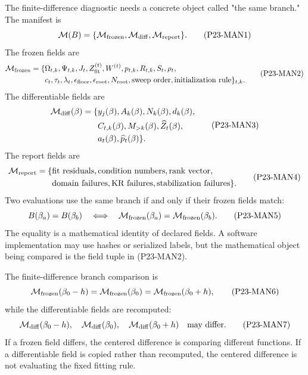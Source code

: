 \documentclass[11pt]{article}
\begin{document}
The finite-difference diagnostic needs a concrete object called "the same
branch."  The manifest is
\[
    \mathcal M(B)
    =
    \{\mathcal M_{\rm frozen},\mathcal M_{\rm diff},\mathcal M_{\rm report}\}.
    \tag{P23-MAN1}
\]
The frozen fields are
\[
\begin{aligned}
    \mathcal M_{\rm frozen}
    =
    \{&
    \Omega_{t,k},\Psi_{t,k},J_t,
    Z_{\rm fit}^{(t)},W^{(t)},p_{t,k},R_{t,k},
    S_t,\rho_t,\\
    &c_t,\tau_t,\lambda_t,\epsilon_{\rm floor},
    \epsilon_{\rm root},N_{\rm root},
    \text{sweep order},\text{initialization rule}\}_{t,k}.
\end{aligned}
    \tag{P23-MAN2}
\]
The differentiable fields are
\[
    \begin{aligned}
    \mathcal M_{\rm diff}(\beta)
    =
    \{&
    y_j(\beta),A_k(\beta),N_k(\beta),d_k(\beta),\\
    &C_{t,k}(\beta),M_{>k}(\beta),\widehat Z_t(\beta),\\
    &a_t(\beta),\widehat p_t(\beta)\}.
    \end{aligned}
    \tag{P23-MAN3}
\]
The report fields are
\[
    \begin{aligned}
    \mathcal M_{\rm report}
    =
    \{&
    \text{fit residuals},\text{condition numbers},\text{rank vector},\\
    &\text{domain failures},\text{KR failures},
      \text{stabilization failures}\}.
    \end{aligned}
    \tag{P23-MAN4}
\]
Two evaluations use the same branch if and only if their frozen fields match:
\[
    B(\beta_a)=B(\beta_b)
    \quad\Longleftrightarrow\quad
    \mathcal M_{\rm frozen}(\beta_a)=\mathcal M_{\rm frozen}(\beta_b).
    \tag{P23-MAN5}
\]
The equality is a mathematical identity of declared fields.  A software
implementation may use hashes or serialized labels, but the mathematical
object being compared is the field tuple in (P23-MAN2).

The finite-difference branch comparison is
\[
    \mathcal M_{\rm frozen}(\beta_0-h)
    =
    \mathcal M_{\rm frozen}(\beta_0)
    =
    \mathcal M_{\rm frozen}(\beta_0+h),
    \tag{P23-MAN6}
\]
while the differentiable fields are recomputed:
\[
    \mathcal M_{\rm diff}(\beta_0-h),
    \quad
    \mathcal M_{\rm diff}(\beta_0),
    \quad
    \mathcal M_{\rm diff}(\beta_0+h)
    \quad
    \text{may differ.}
    \tag{P23-MAN7}
\]
If a frozen field differs, the centered difference is comparing different
functions.  If a differentiable field is copied rather than recomputed, the
centered difference is not evaluating the fixed fitting rule.
\end{document}
